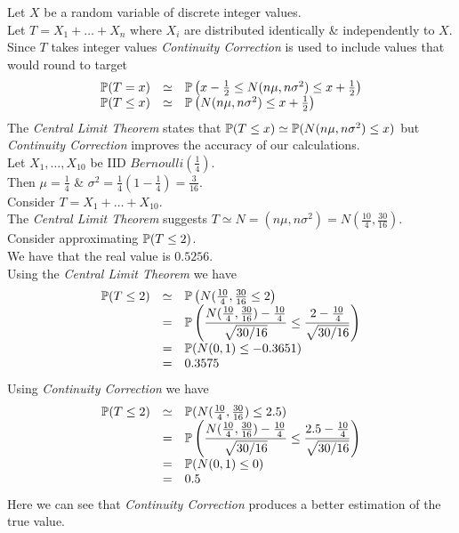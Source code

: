 \documentclass[11pt,a4paper]{article}
\begin{document}
Let $X$ be a random variable of discrete integer values.\\
Let $T=X_1+\dots+X_n$ where $X_i$ are distributed identically \& independently to $X$.\\
Since $T$ takes integer values \textit{Continuity Correction} is used to include values that would round to target
\[\begin{array}{rcl}
\mathbb{P}(T=x)&\simeq&\mathbb{P}\left(x-\frac{1}{2}\leq N(n\mu,n\sigma^2)\leq x+\frac{1}{2}\right)\\
\mathbb{P}(T\leq x)&\simeq&\mathbb{P}\left(N(n\mu,n\sigma^2)\leq x+\frac{1}{2}\right)
\end{array}\]
\nb The \textit{Central Limit Theorem} states that $\mathbb{P}(T\leq x)\simeq\mathbb{P}(N(n\mu,n\sigma^2)\leq x)$ but \textit{Continuity Correction} improves the accuracy of our calculations.\\

Let $X_1,\dots,X_{10}$ be IID $Bernoulli(\frac{1}{4})$.\\
Then $\mu=\frac{1}{4}$ \& $\sigma^2=\frac{1}{4}(1-\frac{1}{4})=\frac{3}{16}$.\\
Consider $T=X_1+\dots+X_{10}$.\\
The \textit{Central Limit Theorem} suggests $T\simeq N=(n\mu,n\sigma^2)=N\left(\frac{10}{4},\frac{30}{16}\right)$.\\
Consider approximating $\mathbb{P}(T\leq2)$.\\
We have that the real value is $0.5256$.\\
Using the \textit{Central Limit Theorem} we have
\[\begin{array}{rcl}
\mathbb{P}(T\leq 2)&\simeq&\mathbb{P}\left(N(\frac{10}{4},\frac{30}{16}\leq2\right)\\
&=&\mathbb{P}\left(\dfrac{N(\frac{10}{4},\frac{30}{16})-\frac{10}{4}}{\sqrt{30/16}}\leq\dfrac{2-\frac{10}{4}}{\sqrt{30/16}}\right)\\
&=&\mathbb{P}(N(0,1)\leq-0.3651)\\
&=&0.3575
\end{array}\]
Using \textit{Continuity Correction} we have
\[\begin{array}{rcl}
\mathbb{P}(T\leq2)&\simeq&\mathbb{P}(N(\frac{10}{4},\frac{30}{16})\leq2.5)\\
&=&\mathbb{P}\left(\dfrac{N(\frac{10}{4},\frac{30}{16})-\frac{10}{4}}{\sqrt{30/16}}\leq\dfrac{2.5-\frac{10}{4}}{\sqrt{30/16}}\right)\\
&=&\mathbb{P}(N(0,1)\leq0)\\
&=&0.5
\end{array}\]
Here we can see that \textit{Continuity Correction} produces a better estimation of the true value.\\
\end{document}
